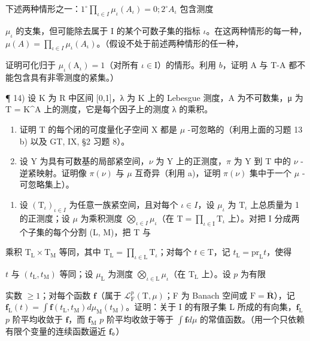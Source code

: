 下述两种情形之一：\(1^{\circ}\prod_{\iota \in I}\mu_{\iota}(A_{\iota}) = 0;2^{\circ}A_{\iota}\) 包含测度

\(\mu_{\iota}\) 的支集，但可能除去属于 I 的某个可数子集的指标 \(\iota\)。在这两种情形的每一种，\(\mu(A) = \prod_{\iota \in I} \mu_{\iota}(A_{\iota})\)。（假设不处于前述两种情形的任一种，

证明可化归于 \(\mu_{\iota}(\mathrm{A}_{\iota}) = 1\)（对所有 \(\iota \in \mathrm{I}\)）的情形。利用 \(b\)，证明 A 与 T-A 都不能包含具有非零测度的紧集。）

¶ 14) 设 K 为 R 中区间 {[}0,1{]}，λ 为 K 上的 Lebesgue 测度，A 为不可数集，μ 为 T = K\^{}A 上的测度，它是每个因子上的测度 λ 的乘积。

\begin{enumerate}
\def\labelenumi{\alph{enumi})}
\item
  证明 T 的每个闭的可度量化子空间 X 都是 \(\mu\) -可忽略的（利用上面的习题 13 b) 以及 GT, IX, §2 习题 8）。
\item
  设 Y 为具有可数基的局部紧空间，\(\nu\) 为 Y 上的正测度，\(\pi\) 为 Y 到 T 中的 \(\nu\) -逆紧映射。证明像 \(\pi(\nu)\) 与 \(\mu\) 互奇异（利用 a)，证明 \(\pi(\nu)\) 集中于一个 \(\mu\) -可忽略集上）。
\end{enumerate}

\begin{enumerate}
\def\labelenumi{\arabic{enumi})}
\setcounter{enumi}{14}
\tightlist
\item
  设 \((\mathrm{T}_{\iota})_{\iota \in I}\) 为任意一族紧空间，且对每个 \(\iota \in I\)，设 \(\mu_{\iota}\) 为 \(\mathrm{T}_{\iota}\) 上总质量为 1 的正测度；设 \(\mu\) 为乘积测度 \(\bigotimes_{\iota \in I} \mu_{\iota}\)（在 \(\mathrm{T} = \prod_{\iota \in \mathrm{I}}\mathrm{T}_{\iota}\) 上）。对把 I 分成两个子集的每个分割 (L, M)，把 T 与
\end{enumerate}

乘积 \(\mathrm{T_L} \times \mathrm{T_M}\) 等同，其中 \(\mathrm{T_L} = \prod_{\iota \in \mathrm{L}} \mathrm{T}_{\iota}\)；对每个 \(t \in \mathrm{T}\)，记 \(t_{\mathrm{L}} = \mathrm{pr}_{\mathrm{L}} t\)，使得

\(t\) 与 \((t_{\mathrm{L}}, t_{\mathrm{M}})\) 等同；设 \(\mu_{\mathrm{L}}\) 为测度 \(\bigotimes_{\iota \in \mathrm{L}} \mu_{\iota}\)（在 \(\mathrm{T}_{\mathrm{L}}\) 上）。设 \(p\) 为有限

实数 \(\geqslant 1\)；对每个函数 \(\mathbf{f}\)（属于 \(\mathcal{L}_{\mathrm{F}}^{p}(\mathrm{T},\mu)\)；F 为 Banach 空间或 \(\mathrm{F} = \overline{\mathbf{R}}\)），记 \(\mathbf{f}_{\mathrm{L}}(t) = \int \mathbf{f}(t_{\mathrm{L}},t_{\mathrm{M}}) d\mu_{\mathrm{M}}(t_{\mathrm{M}})\)。证明：关于 I 的有限子集 L 所成的有向集，\(\mathbf{f}_{\mathrm{L}}\) \(p\) 阶平均收敛于 \(\mathbf{f}\)，而 \(\mathbf{f}_{\mathrm{M}}\) \(p\) 阶平均收敛于等于 \(\int \mathbf{f} d\mu\) 的常值函数。（用一个只依赖有限个变量的连续函数逼近 \(\mathbf{f}\)。）

